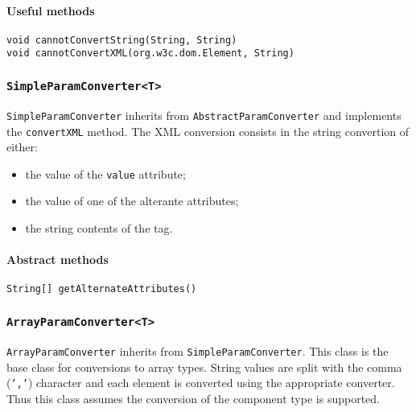 \documentclass[a4paper]{article}
\begin{document}
\paragraph{Useful methods}
\texttt{void cannotConvertString(String, String)}\\
\texttt{void cannotConvertXML(org.w3c.dom.Element, String)}\\

\subsubsection{\texttt{SimpleParamConverter<T>}}
\texttt{SimpleParamConverter} inherits from \texttt{AbstractParamConverter} and implements the \texttt{convertXML} method.
The XML conversion consists in the string convertion of either:
\begin{itemize}
\item the value of the \texttt{value} attribute;
\item the value of one of the alterante attributes;
\item the string contents of the tag.
\end{itemize}

\paragraph{Abstract methods}
\texttt{String[] getAlternateAttributes()}

\subsubsection{\texttt{ArrayParamConverter<T>}}
\texttt{ArrayParamConverter} inherits from \texttt{SimpleParamConverter}.
This class is the base class for conversions to array types.
String values are split with the comma (\texttt{','}) character and each element is converted using the appropriate converter.
Thus this class assumes the conversion of the component type is supported.
\end{document}
